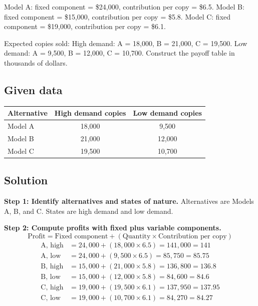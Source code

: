 \begin{ExamProblems}
		Model A: fixed component = \$24{,}000, contribution per copy = \$6.5.
		Model B: fixed component = \$15{,}000, contribution per copy = \$5.8.
		Model C: fixed component = \$19{,}000, contribution per copy = \$6.1.
		
		Expected copies sold:
		High demand: A = 18{,}000, B = 21{,}000, C = 19{,}500.
		Low demand: A = 9{,}500, B = 12{,}000, C = 10{,}700.
		Construct the payoff table in thousands of dollars.
		
		\subsection*{Given data}
		\begin{center}
			\begin{tabular}{l c c}
				\toprule
				Alternative & High demand copies & Low demand copies \\
				\midrule
				Model A & 18{,}000 & 9{,}500 \\
				Model B & 21{,}000 & 12{,}000 \\
				Model C & 19{,}500 & 10{,}700 \\
				\bottomrule
			\end{tabular}
		\end{center}
		
		\subsection*{Solution}
		\textbf{Step 1: Identify alternatives and states of nature.} Alternatives are Models A, B, and C. States are high demand and low demand.
		
		\textbf{Step 2: Compute profits with fixed plus variable components.}
		\[
		\text{Profit} = \text{Fixed component} + (\text{Quantity} \times \text{Contribution per copy})
		\]
		\[
		\begin{aligned}
		\text{A, high} &= 24{,}000 + (18{,}000 \times 6.5) = 141{,}000 = 141 \\
		\text{A, low} &= 24{,}000 + (9{,}500 \times 6.5) = 85{,}750 = 85.75 \\
		\text{B, high} &= 15{,}000 + (21{,}000 \times 5.8) = 136{,}800 = 136.8 \\
		\text{B, low} &= 15{,}000 + (12{,}000 \times 5.8) = 84{,}600 = 84.6 \\
		\text{C, high} &= 19{,}000 + (19{,}500 \times 6.1) = 137{,}950 = 137.95 \\
		\text{C, low} &= 19{,}000 + (10{,}700 \times 6.1) = 84{,}270 = 84.27
		\end{aligned}
		\]
		

\end{ExamProblems}
